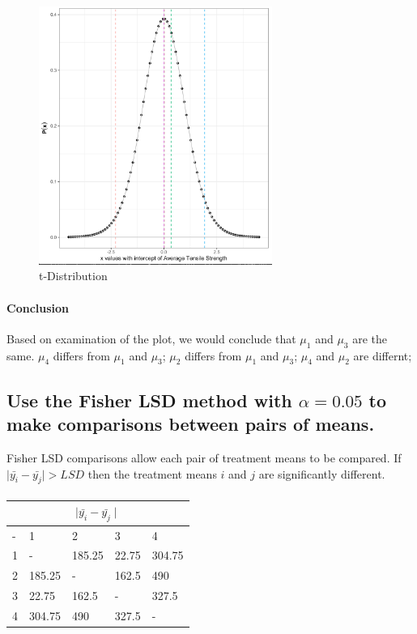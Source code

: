 \documentclass[11pt]{article}
\begin{document}
\begin{figure}[H]
    \centering
    \includegraphics[width=3.0in]{../pictures/hw2_q1_b.png}
    \caption{t-Distribution}
    \label{t-Distribution}
\end{figure}


\paragraph{Conclusion}
Based on examination of the plot, we would conclude that 
$\displaystyle \mu_1$ and $\displaystyle \mu_3$ are the same.
$\displaystyle \mu_4$ differs from $\displaystyle \mu_1$ and $\displaystyle \mu_3$;
$\displaystyle \mu_2$ differs from $\displaystyle \mu_1$ and $\displaystyle \mu_3$;
$\displaystyle \mu_4$ and $\displaystyle \mu_2$ are differnt;


\subsection{Use the Fisher LSD method with $\displaystyle \alpha=0.05$ to make comparisons between pairs of means.}

Fisher LSD comparisons allow each pair of treatment means to be compared. 
If $\displaystyle \mid \bar{y_i} - \bar{y_j} \mid > LSD$ then the treatment means  $\displaystyle i$ and $\displaystyle j$ are significantly different. 

\paragraph{}
\begin{tabular}{ |p{1cm}|p{1cm}|p{1cm}|p{1cm}|p{1cm}|  }
    \hline
    \multicolumn{5}{|c|}{$\displaystyle \mid \bar{y_i} - \bar{y_j} \mid$ } \\
    \hline
     - & 1 & 2 & 3 & 4 \\ \hline
    1 & - & \cellcolor{gray!30} 185.25 & 22.75 & \cellcolor{gray!30}304.75 \\ \hline
    2 & \cellcolor{gray!30} 185.25 & - & 162.5 & \cellcolor{gray!30}490 \\ \hline
    3 & 22.75 & 162.5 & - & \cellcolor{gray!30}327.5 \\ \hline
    4 & \cellcolor{gray!30}304.75 & \cellcolor{gray!30}490 & \cellcolor{gray!30}327.5 & - \\ \hline
\end{tabular}
\end{document}
